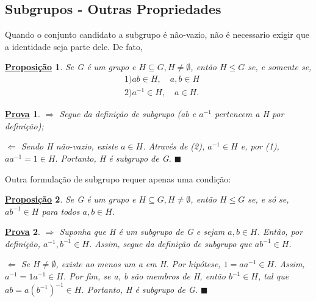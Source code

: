 \documentclass{article}
\newtheorem*{prop*}{\underline{Proposi\c c\~ao}}
\newtheorem*{proof*}{\underline{Prova}}
\renewcommand\qedsymbol{$\blacksquare$}
\begin{document}
\subsection{Subgrupos - Outras Propriedades}
  Quando o conjunto candidato a subgrupo \'e n\~ao-vazio, n\~ao \'e necessario exigir que a identidade seja parte dele. De fato,
\begin{prop*}
  Se G \'e um grupo e $H\subseteq{G}, H \neq\emptyset$, ent\~ao $H\leq{G}$ se, e somente se,
 \begin{align*}
   &1) ab\in H, \quad a, b\in H\\
   &2) a^{-1}\in H, \quad a\in H.
 \end{align*}
\end{prop*}
\begin{proof*}
  $\Rightarrow$ Segue da defini\c c\~ao de subgrupo (ab e $a^{-1}$ pertencem a H por defini\c c\~ao);

  $\Leftarrow$ Sendo H n\~ao-vazio, existe $a\in H$. Atrav\'es de (2), $a^{-1}\in H$ e, por (1), $aa^{-1} = 1\in H.$ Portanto,
H \'e subgrupo de G. \qedsymbol
\end{proof*}
  Outra formula\c c\~ao de subgrupo requer apenas uma condi\c c\~ao:
 \begin{prop*}
   Se G \'e um grupo e $H\subseteq{G}, H \neq\emptyset$, ent\~ao $H\leq{G}$ se, e s\'o se, $ab^{-1}\in H$ para todos $a, b\in H.$
 \end{prop*}
\begin{proof*}
  $\Rightarrow$ Suponha que H \'e um subgrupo de G e sejam $a, b\in H$. Ent\~ao, por defini\c c\~ao, $a^{-1}, b^{-1}\in H$. Assim,
segue da defini\c c\~ao de subgrupo que $ab^{-1}\in H$.

  $\Leftarrow$ Se $H \neq\emptyset$, existe ao menos um a em H. Por hip\'otese, $1 = aa^{-1}\in H$. Assim, $a^{-1} = 1a^{-1}\in H$.
Por fim, se a, b s\~ao membros de H, ent\~ao $b^{-1}\in H$, tal que $ab = a(b^{-1})^{-1}\in H$. Portanto, H \'e subgrupo de G. \qedsymbol
\end{proof*}
\end{document}
